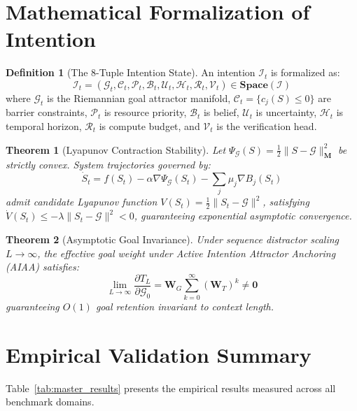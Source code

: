 \documentclass[10pt,twocolumn,letterpaper]{article}
\theoremstyle{plain}
\newtheorem{theorem}{Theorem}
\theoremstyle{definition}
\newtheorem{definition}{Definition}
\begin{document}
\section{Mathematical Formalization of Intention}
\begin{definition}[The 8-Tuple Intention State]
An intention $\mathcal{I}_t$ is formalized as:
\begin{equation}
\mathcal{I}_t = \left( \mathcal{G}_t, \mathcal{C}_t, \mathcal{P}_t, \mathcal{B}_t, \mathcal{U}_t, \mathcal{H}_t, \mathcal{R}_t, \mathcal{V}_t \right) \in \mathbf{Space}(\mathcal{I})
\end{equation}
where $\mathcal{G}_t$ is the Riemannian goal attractor manifold, $\mathcal{C}_t = \{c_j(S) \le 0\}$ are barrier constraints, $\mathcal{P}_t$ is resource priority, $\mathcal{B}_t$ is belief, $\mathcal{U}_t$ is uncertainty, $\mathcal{H}_t$ is temporal horizon, $\mathcal{R}_t$ is compute budget, and $\mathcal{V}_t$ is the verification head.
\end{definition}

\begin{theorem}[Lyapunov Contraction Stability]
Let $\Psi_{\mathcal{G}}(S) = \frac{1}{2}\|S - \mathcal{G}\|_{\mathbf{M}}^2$ be strictly convex. System trajectories governed by:
\begin{equation}
\dot{S}_t = f(S_t) - \alpha \nabla \Psi_{\mathcal{G}}(S_t) - \sum_{j} \mu_j \nabla B_j(S_t)
\end{equation}
admit candidate Lyapunov function $V(S_t) = \frac{1}{2}\|S_t - \mathcal{G}\|^2$, satisfying $\dot{V}(S_t) \le -\lambda \|S_t - \mathcal{G}\|^2 < 0$, guaranteeing exponential asymptotic convergence.
\end{theorem}

\begin{theorem}[Asymptotic Goal Invariance]
Under sequence distractor scaling $L \to \infty$, the effective goal weight under Active Intention Attractor Anchoring (AIAA) satisfies:
\begin{equation}
\lim_{L \to \infty} \frac{\partial T_L}{\partial \mathcal{G}_0} = \mathbf{W}_G \sum_{k=0}^\infty (\mathbf{W}_T)^k \neq \mathbf{0}
\end{equation}
guaranteeing $O(1)$ goal retention invariant to context length.
\end{theorem}

\section{Empirical Validation Summary}
Table~\ref{tab:master_results} presents the empirical results measured across all benchmark domains.
\end{document}
